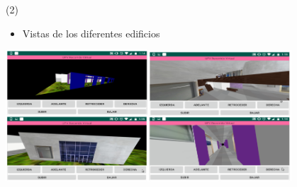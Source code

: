\begin{frame}{\citetitle{\EntradaBibtex}  (2)}
\begin{itemize}
\item Vistas de los diferentes edificios
\end{itemize}
    \begin{center}
     \includegraphics[width=0.80\textwidth]{Figs/RecorridoUPV_V2}\\
     \end{center}
\end{frame}

